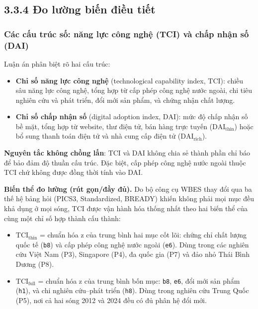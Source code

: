 \documentclass[
  a4paper,
  13pt]{extreport}
\providecommand{\tightlist}{%
  \setlength{\itemsep}{0pt}\setlength{\parskip}{0pt}}
\begin{document}
\hypertarget{ux111o-lux1b0ux1eddng-biux1ebfn-ux111iux1ec1u-tiux1ebft}{%
\subsection{3.3.4 Đo lường biến điều
tiết}\label{ux111o-lux1b0ux1eddng-biux1ebfn-ux111iux1ec1u-tiux1ebft}}

\hypertarget{cuxe1c-cux1ea5u-truxfac-sux1ed1-nux103ng-lux1ef1c-cuxf4ng-nghux1ec7-tci-vuxe0-chux1ea5p-nhux1eadn-sux1ed1-dai}{%
\subsubsection{Các cấu trúc số: năng lực công nghệ (TCI) và chấp nhận số
(DAI)}\label{cuxe1c-cux1ea5u-truxfac-sux1ed1-nux103ng-lux1ef1c-cuxf4ng-nghux1ec7-tci-vuxe0-chux1ea5p-nhux1eadn-sux1ed1-dai}}

Luận án phân biệt rõ hai cấu trúc:

\begin{itemize}
\tightlist
\item
  \textbf{Chỉ số năng lực công nghệ} (technological capability index,
  \(\mathrm{TCI}\)): chiều sâu năng lực công nghệ, tổng hợp từ cấp phép
  công nghệ nước ngoài, chi tiêu nghiên cứu và phát triển, đổi mới sản
  phẩm, và chứng nhận chất lượng.
\item
  \textbf{Chỉ số chấp nhận số} (digital adoption index,
  \(\mathrm{DAI}\)): mức độ chấp nhận số bề mặt, tổng hợp từ website,
  thư điện tử, bán hàng trực tuyến (\(\mathrm{DAI}_{\text{thin}}\)) hoặc
  bổ sung thanh toán điện tử và nhà cung cấp điện tử
  (\(\mathrm{DAI}_{\text{rich}}\)).
\end{itemize}

\textbf{Nguyên tắc không chồng lấn}: TCI và DAI không chia sẻ thành phần
chỉ báo để bảo đảm độ thuần cấu trúc. Đặc biệt, cấp phép công nghệ nước
ngoài thuộc TCI chứ không được đồng thời tính vào DAI.

\textbf{Biến thể đo lường (rút gọn/đầy đủ).} Do bộ công cụ WBES thay đổi
qua ba thế hệ bảng hỏi (PICS3, Standardized, BREADY) khiến không phải
mọi mục đều khả dụng ở mọi sóng, TCI được vận hành hóa thống nhất theo
hai biến thể của cùng một chỉ số hợp thành cấu thành:

\begin{itemize}
\tightlist
\item
  \(\mathrm{TCI}_{\text{thin}}\) = chuẩn hóa z của trung bình hai mục
  cốt lõi: chứng chỉ chất lượng quốc tế (\texttt{b8}) và cấp phép công
  nghệ nước ngoài (\texttt{e6}). Dùng trong các nghiên cứu Việt Nam
  (P3), Singapore (P4), đa quốc gia (P7) và đảo nhỏ Thái Bình Dương
  (P8).
\item
  \(\mathrm{TCI}_{\text{full}}\) = chuẩn hóa z của trung bình bốn mục:
  \texttt{b8}, \texttt{e6}, đổi mới sản phẩm (\texttt{h1}), và chi
  nghiên cứu--phát triển (\texttt{h8}). Dùng trong nghiên cứu Trung Quốc
  (P5), nơi cả hai sóng 2012 và 2024 đều có đủ phân hệ đổi mới.
\end{itemize}
\end{document}
